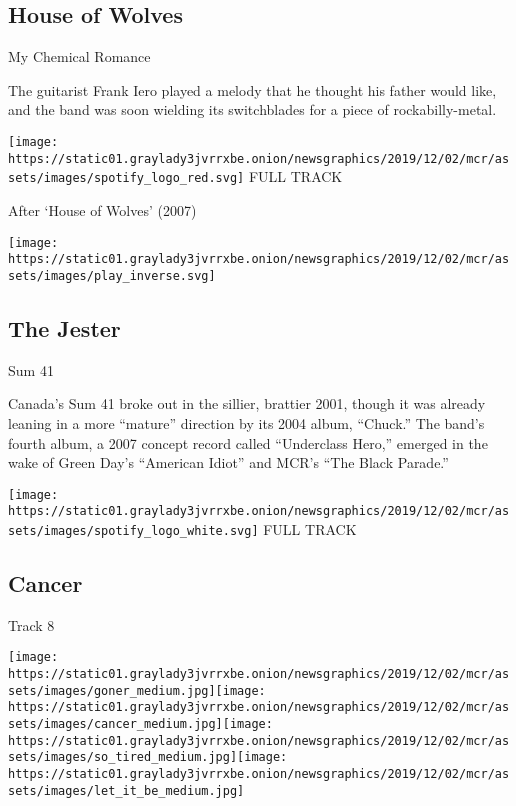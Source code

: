 \hypertarget{house-of-wolves-1}{%
\subsection{House of Wolves}\label{house-of-wolves-1}}

My Chemical Romance

The guitarist Frank Iero played a melody that he thought his father
would like, and the band was soon wielding its switchblades for a piece
of rockabilly-metal.

\href{https://open.spotify.com/track/7j2Bmzpnf6RwEWEQ2sv8Ho?si=41y9hCIFSTix35FKmQBNPg}{}

\texttt{[image: https://static01.graylady3jvrrxbe.onion/newsgraphics/2019/12/02/mcr/assets/images/spotify\_logo\_red.svg]}
FULL TRACK

After `House of Wolves' (2007)

\texttt{[image: https://static01.graylady3jvrrxbe.onion/newsgraphics/2019/12/02/mcr/assets/images/play\_inverse.svg]}

\hypertarget{the-jester}{%
\subsection{The Jester}\label{the-jester}}

Sum 41

Canada's Sum 41 broke out in the sillier, brattier 2001, though it was
already leaning in a more ``mature'' direction by its 2004 album,
``Chuck.'' The band's fourth album, a 2007 concept record called
``Underclass Hero,'' emerged in the wake of Green Day's ``American
Idiot'' and MCR's ``The Black Parade.''

\href{https://open.spotify.com/track/0KWJ0BsX0kvEFED13gRyFL?si=cJN4XqL5QEyYBc-1x83RPQ}{}

\texttt{[image: https://static01.graylady3jvrrxbe.onion/newsgraphics/2019/12/02/mcr/assets/images/spotify\_logo\_white.svg]}
FULL TRACK

\hypertarget{cancer}{%
\subsection{Cancer}\label{cancer}}

Track 8

\texttt{[image: https://static01.graylady3jvrrxbe.onion/newsgraphics/2019/12/02/mcr/assets/images/goner\_medium.jpg]}\texttt{[image: https://static01.graylady3jvrrxbe.onion/newsgraphics/2019/12/02/mcr/assets/images/cancer\_medium.jpg]}\texttt{[image: https://static01.graylady3jvrrxbe.onion/newsgraphics/2019/12/02/mcr/assets/images/so\_tired\_medium.jpg]}\texttt{[image: https://static01.graylady3jvrrxbe.onion/newsgraphics/2019/12/02/mcr/assets/images/let\_it\_be\_medium.jpg]}

